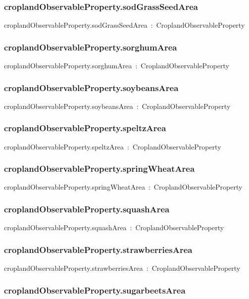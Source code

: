 \documentclass{article}
\begin{document}
\subsubsection*{croplandObservableProperty.sodGrassSeedArea}

croplandObservableProperty.sodGrassSeedArea~:~CroplandObservableProperty

\subsubsection*{croplandObservableProperty.sorghumArea}

croplandObservableProperty.sorghumArea~:~CroplandObservableProperty

\subsubsection*{croplandObservableProperty.soybeansArea}

croplandObservableProperty.soybeansArea~:~CroplandObservableProperty

\subsubsection*{croplandObservableProperty.speltzArea}

croplandObservableProperty.speltzArea~:~CroplandObservableProperty

\subsubsection*{croplandObservableProperty.springWheatArea}

croplandObservableProperty.springWheatArea~:~CroplandObservableProperty

\subsubsection*{croplandObservableProperty.squashArea}

croplandObservableProperty.squashArea~:~CroplandObservableProperty

\subsubsection*{croplandObservableProperty.strawberriesArea}

croplandObservableProperty.strawberriesArea~:~CroplandObservableProperty

\subsubsection*{croplandObservableProperty.sugarbeetsArea}
\end{document}
